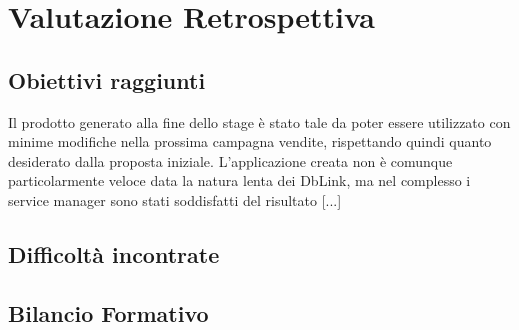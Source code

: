 \section{Valutazione Retrospettiva}
\subsection{Obiettivi raggiunti}
Il prodotto generato alla fine dello stage è stato tale da poter essere utilizzato con minime modifiche nella prossima campagna vendite, rispettando quindi quanto desiderato dalla proposta iniziale.
L'applicazione creata non è comunque particolarmente veloce data la natura lenta dei DbLink, ma nel complesso i service manager sono stati soddisfatti del risultato
[...]

\subsection{Difficoltà incontrate}


\subsection{Bilancio Formativo}